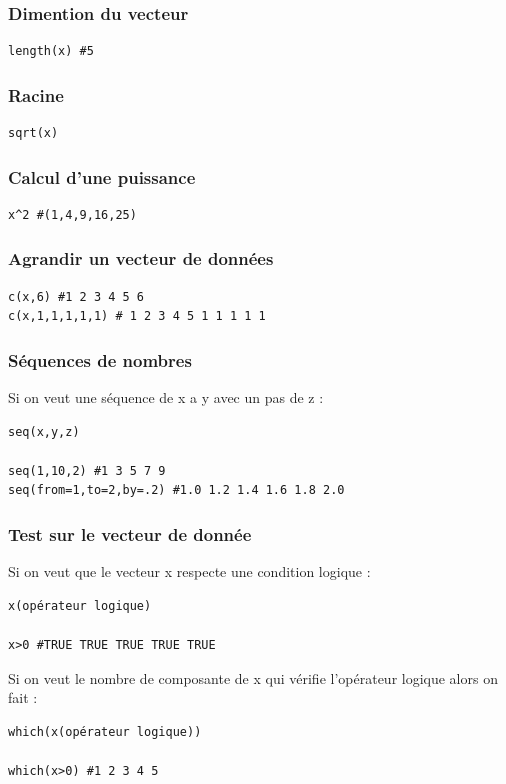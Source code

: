 \documentclass{article}
\begin{document}
\subsubsection{Dimention du vecteur}
\begin{verbatim}
length(x) #5
\end{verbatim}

\subsubsection{Racine}
\begin{verbatim}
sqrt(x)
\end{verbatim}

\subsubsection{Calcul d'une puissance}
\begin{verbatim}
x^2 #(1,4,9,16,25)
\end{verbatim}

\subsubsection{Agrandir un vecteur de données}
\begin{verbatim}
c(x,6) #1 2 3 4 5 6
c(x,1,1,1,1,1) # 1 2 3 4 5 1 1 1 1 1
\end{verbatim}

\subsubsection{Séquences de nombres}
Si on veut une séquence de x a y avec un pas de z :
\begin{verbatim}
seq(x,y,z)

seq(1,10,2) #1 3 5 7 9
seq(from=1,to=2,by=.2) #1.0 1.2 1.4 1.6 1.8 2.0
\end{verbatim}

\subsubsection{Test sur le vecteur de donnée}
Si on veut que le vecteur x respecte une condition logique :
\begin{verbatim}
x(opérateur logique)

x>0 #TRUE TRUE TRUE TRUE TRUE

\end{verbatim}
Si on veut le nombre de composante de x qui vérifie l'opérateur logique alors on fait : 
\begin{verbatim}
which(x(opérateur logique))

which(x>0) #1 2 3 4 5
\end{verbatim}
\end{document}
